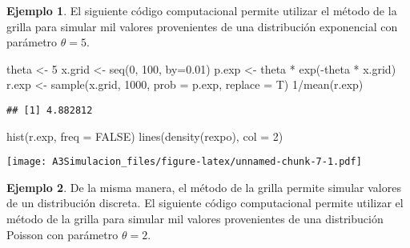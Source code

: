 \documentclass[
  12pt,
  spanish,
]{book}
\newenvironment{Shaded}{\begin{snugshade}}{\end{snugshade}}
\newcommand{\AttributeTok}[1]{\textcolor[rgb]{0.77,0.63,0.00}{#1}}
\newcommand{\ConstantTok}[1]{\textcolor[rgb]{0.00,0.00,0.00}{#1}}
\newcommand{\DecValTok}[1]{\textcolor[rgb]{0.00,0.00,0.81}{#1}}
\newcommand{\FloatTok}[1]{\textcolor[rgb]{0.00,0.00,0.81}{#1}}
\newcommand{\FunctionTok}[1]{\textcolor[rgb]{0.00,0.00,0.00}{#1}}
\newcommand{\NormalTok}[1]{#1}
\newcommand{\OtherTok}[1]{\textcolor[rgb]{0.56,0.35,0.01}{#1}}
\newcommand{\SpecialCharTok}[1]{\textcolor[rgb]{0.00,0.00,0.00}{#1}}
\theoremstyle{definition}
\theoremstyle{definition}
\newtheorem{example}{Ejemplo}[chapter]
\theoremstyle{definition}
\theoremstyle{definition}
\theoremstyle{remark}
\begin{document}
\begin{example}
\protect\hypertarget{exm:unnamed-chunk-6}{}{\label{exm:unnamed-chunk-6} }El siguiente código computacional permite utilizar el método de la grilla para simular mil valores provenientes de una distribución exponencial con parámetro \(\theta = 5\).
\end{example}

\begin{Shaded}
\begin{Highlighting}[]
\NormalTok{theta }\OtherTok{\textless{}{-}} \DecValTok{5}
\NormalTok{x.grid }\OtherTok{\textless{}{-}} \FunctionTok{seq}\NormalTok{(}\DecValTok{0}\NormalTok{, }\DecValTok{100}\NormalTok{, }\AttributeTok{by=}\FloatTok{0.01}\NormalTok{)}
\NormalTok{p.exp }\OtherTok{\textless{}{-}}\NormalTok{ theta }\SpecialCharTok{*} \FunctionTok{exp}\NormalTok{(}\SpecialCharTok{{-}}\NormalTok{theta }\SpecialCharTok{*}\NormalTok{ x.grid)}
\NormalTok{r.exp }\OtherTok{\textless{}{-}} \FunctionTok{sample}\NormalTok{(x.grid, }\DecValTok{1000}\NormalTok{, }\AttributeTok{prob =}\NormalTok{ p.exp, }\AttributeTok{replace =}\NormalTok{ T)}
\DecValTok{1}\SpecialCharTok{/}\FunctionTok{mean}\NormalTok{(r.exp)}
\end{Highlighting}
\end{Shaded}

\begin{verbatim}
## [1] 4.882812
\end{verbatim}

\begin{Shaded}
\begin{Highlighting}[]
\FunctionTok{hist}\NormalTok{(r.exp, }\AttributeTok{freq =} \ConstantTok{FALSE}\NormalTok{)}
\FunctionTok{lines}\NormalTok{(}\FunctionTok{density}\NormalTok{(rexpo), }\AttributeTok{col =} \DecValTok{2}\NormalTok{)}
\end{Highlighting}
\end{Shaded}

\texttt{[image: A3Simulacion\_files/figure-latex/unnamed-chunk-7-1.pdf]}
\begin{example}
\protect\hypertarget{exm:unnamed-chunk-8}{}{\label{exm:unnamed-chunk-8} }De la misma manera, el método de la grilla permite simular valores de un distribución discreta. El siguiente código computacional permite utilizar el método de la grilla para simular mil valores provenientes de una distribución Poisson con parámetro \(\theta = 2\).
\end{example}
\end{document}
